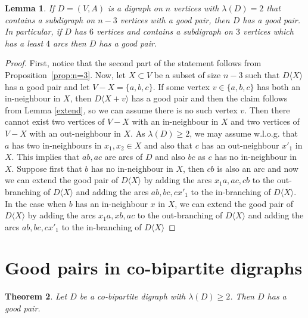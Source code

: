 \documentclass{article}
\newtheorem{theorem}{Theorem}
\newtheorem{lemma}[theorem]{Lemma}
\theoremstyle{definition}
\newcommand{\induce}[2]{#1\langle #2 \rangle}
\newcommand{\2}{\vspace{0.2cm}}
\begin{document}
\begin{lemma}\label{lem:3good} If $D=(V,A)$ is a digraph on $n$
    vertices with $\lambda{}(D)=2$ that contains a subdigraph on $n-3$
    vertices with a good pair, then $D$ has a good pair. In
    particular, if $D$ has $6$ vertices and contains a subdigraph on $3$
    vertices which has a least $4$ arcs then $D$ has a good pair.
  \end{lemma}
  \begin{proof}
    First, notice that the second part of the statement follows from
    Proposition~\ref{prop:n=3}. Now, let $X\subset V$ be a subset of
    size $n-3$ such that $\induce{D}{X}$ has a good pair and let
    $V-X=\{a,b,c\}$. If some vertex $v\in\{a,b,c\}$ has both an
    in-neighbour in $X$, then $\induce{D}{X+v}$ has a good pair and
    then the claim follows from Lemma \ref{extend}, so we can assume
    there is no such vertex $v$. Then there cannot exist two vertices of
    $V-X$ with an in-neighbour in $X$ and two vertices of $V-X$ with an
    out-neighbour in $X$. As $\lambda(D)\ge 2$, we may assume
    w.l.o.g. that $a$ has two in-neighbours in $x_1,x_2\in X$ and also
    that $c$ has an out-neighbour $x'_1$ in $X$. This implies that
    $ab,ac$ are arcs of $D$ and also $bc$ as $c$ has no in-neighbour
    in $X$. Suppose first that $b$ has no in-neighbour in $X$, then
    $cb$ is also an arc and now we can extend the good pair of
    $\induce{D}{X}$ by adding the arcs $x_1a,ac,cb$ to the
    out-branching of $\induce{D}{X}$ and adding the arcs $ab,bc,cx'_1$
    to the in-branching of $\induce{D}{X}$. In the case when  $b$ has an
    in-neighbour $x$ in $X$, we can extend the good pair of
    $\induce{D}{X}$ by adding the arcs $x_1a,xb,ac$ to the
    out-branching of $\induce{D}{X}$ and adding the arcs $ab,bc,cx'_1$
    to the in-branching of $\induce{D}{X}$
  \end{proof}


\section{Good pairs in co-bipartite digraphs}

\begin{theorem} \label{cobipartite}
Let $D$ be a co-bipartite digraph with $\lambda(D) \geq 2$.  Then $D$
has a good pair.
\end{theorem}
\end{document}
